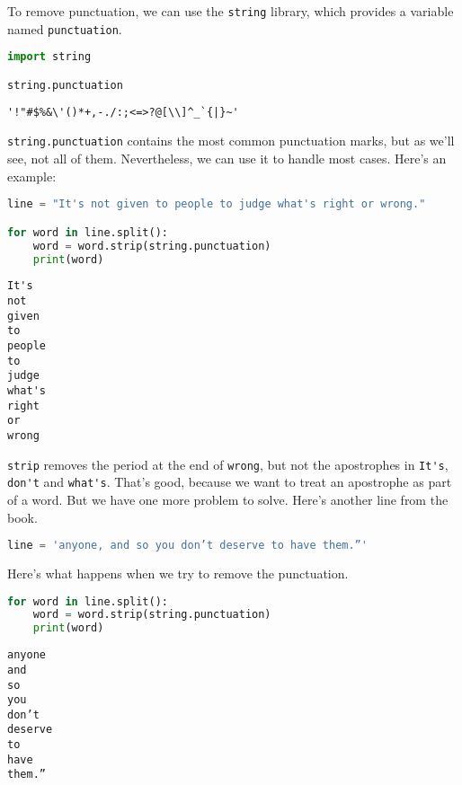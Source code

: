 To remove punctuation, we can use the \passthrough{\lstinline!string!}
library, which provides a variable named
\passthrough{\lstinline!punctuation!}.

\begin{lstlisting}[language=Python,style=source]
import string

string.punctuation
\end{lstlisting}

\begin{lstlisting}[style=output]
'!"#$%&\'()*+,-./:;<=>?@[\\]^_`{|}~'
\end{lstlisting}

\passthrough{\lstinline!string.punctuation!} contains the most common
punctuation marks, but as we'll see, not all of them. Nevertheless, we
can use it to handle most cases. Here's an example:

\begin{lstlisting}[language=Python,style=source]
line = "It's not given to people to judge what's right or wrong."

for word in line.split():
    word = word.strip(string.punctuation)
    print(word)
\end{lstlisting}

\begin{lstlisting}[style=output]
It's
not
given
to
people
to
judge
what's
right
or
wrong
\end{lstlisting}

\passthrough{\lstinline!strip!} removes the period at the end of
\passthrough{\lstinline!wrong!}, but not the apostrophes in
\passthrough{\lstinline!It's!}, \passthrough{\lstinline!don't!} and
\passthrough{\lstinline!what's!}. That's good, because we want to treat
an apostrophe as part of a word.
But we have one more problem to solve. Here's another line from the book.

\begin{lstlisting}[language=Python,style=source]
line = 'anyone, and so you don’t deserve to have them.”'
\end{lstlisting}

Here's what happens when we try to remove the punctuation.

\begin{lstlisting}[language=Python,style=source]
for word in line.split():
    word = word.strip(string.punctuation)
    print(word)
\end{lstlisting}

\begin{lstlisting}[style=output]
anyone
and
so
you
don’t
deserve
to
have
them.”
\end{lstlisting}

